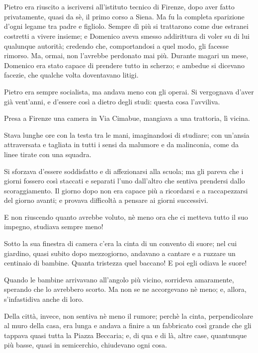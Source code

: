 \chapter{}

Pietro era riuscito a iscriversi all’istituto tecnico di Firenze, dopo aver fatto privatamente, quasi da sè, il primo corso a Siena. Ma fu la completa sparizione d’ogni legame tra padre e figliolo. Sempre dì più si trattarono come due estranei costretti a vivere insieme; e Domenico aveva smesso addirittura di voler su di lui qualunque autorità; credendo che, comportandosi a quel modo, gli facesse rimorso. Ma, ormai, non l’avrebbe perdonato mai più. Durante magari un mese, Domenico era stato capace di prendere tutto in scherzo; e ambedue si dicevano facezie, che qualche volta doventavano litigi.

Pietro era sempre socialista, ma andava meno con gli operai. Si vergognava d'aver già vent'anni, e d’essere così a dietro degli studi: questa cosa l’avviliva.

Presa a Firenze una camera in Via Cimabue, mangiava a una trattoria, lì vicina.

Stava lunghe ore con la testa tra le mani, imaginandosi di studiare; con un’ansia attraversata e tagliata in tutti i sensi da malumore e da malinconia, come da linee tirate con una squadra.

Si sforzava d’essere soddisfatto e di affezionarsi alla scuola; ma gli pareva che i giorni fossero così staccati e separati l'uno dall'altro che sentiva prendersi dallo scoraggiamento. Il giorno dopo non era capace più a ricordarsi e a raccapezzarsi del giorno avanti; e provava difficoltà a pensare ai giorni successivi.

E non riuscendo quanto avrebbe voluto, nè meno ora che ci metteva tutto il suo impegno, studiava sempre meno!

Sotto la sua finestra di camera c’era la cinta di un convento di suore; nel cui giardino, quasi subito dopo mezzogiorno, andavano a cantare e a ruzzare un centinaio di bambine. Quanta tristezza quel baccano! E poi egli odiava le suore!

Quando le bambine arrivavano all'angolo più vicino, sorrideva amaramente, sperando che lo avrebbero scorto. Ma non se ne accorgevano nè meno; e, allora, s’infastidiva anche di loro.

Della città, invece, non sentiva nè meno il rumore; perchè la cinta, perpendicolare al muro della casa, era lunga e andava a finire a un fabbricato così grande che gli tappava quasi tutta la Piazza Beccaria; e, di qua e di là, altre case, quantunque più basse, quasi in semicerchio, chiudevano ogni cosa.

